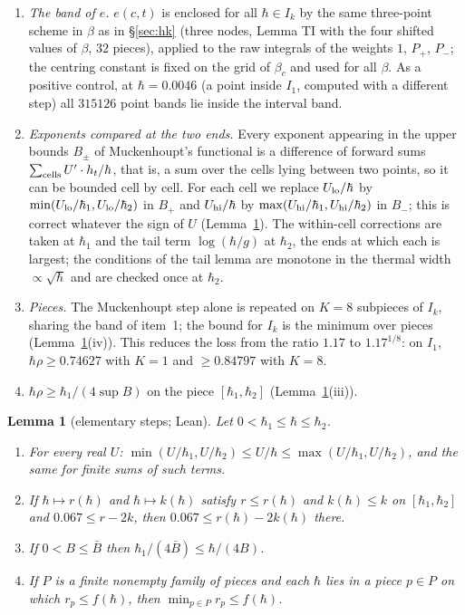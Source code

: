 \documentclass[11pt,a4paper]{article}
\newtheorem{lemma}[theorem]{Lemma}
\theoremstyle{definition}
\theoremstyle{remark}
\newcommand{\hr}{\hbar\rho}
\begin{document}
\begin{enumerate}[leftmargin=2em]
\item \emph{The band of $e$.} $e(c,t)$ is enclosed for all $\hbar\in I_k$ by the same three-point scheme in $\beta$ as in \S\ref{sec:hk} (three nodes, Lemma TI with the four shifted values of $\beta$, $32$ pieces), applied to the raw integrals of the weights $1$, $P_+$, $P_-$; the centring constant is fixed on the grid of $\beta_c$ and used for all $\beta$. As a positive control, at $\hbar=0.0046$ (a point inside $I_1$, computed with a different step) all $315126$ point bands lie inside the interval band.
\item \emph{Exponents compared at the two ends.} Every exponent appearing in the upper bounds $B_\pm$ of Muckenhoupt's functional is a difference of forward sums $\sum_{\rm cells}U'\cdot h_t/\hbar$, that is, a sum over the cells lying between two points, so it can be bounded cell by cell. For each cell we replace $U_{\rm lo}/\hbar$ by $\min(U_{\rm lo}/\hbar_1,U_{\rm lo}/\hbar_2)$ in $B_+$ and $U_{\rm hi}/\hbar$ by $\max(U_{\rm hi}/\hbar_1,U_{\rm hi}/\hbar_2)$ in $B_-$; this is correct whatever the sign of $U$ (Lemma~\ref{lem:cell}). The within-cell corrections are taken at $\hbar_1$ and the tail term $\log(\hbar/g)$ at $\hbar_2$, the ends at which each is largest; the conditions of the tail lemma are monotone in the thermal width $\propto\sqrt\hbar$ and are checked once at $\hbar_2$.
\item \emph{Pieces.} The Muckenhoupt step alone is repeated on $K=8$ subpieces of $I_k$, sharing the band of item~1; the bound for $I_k$ is the minimum over pieces (Lemma~\ref{lem:cell}(iv)). This reduces the loss from the ratio $1.17$ to $1.17^{1/8}$: on $I_1$, $\hr\ge0.74627$ with $K=1$ and $\ge0.84797$ with $K=8$.
\item $\hr\ge\hbar_1/(4\sup B)$ on the piece $[\hbar_1,\hbar_2]$ (Lemma~\ref{lem:cell}(iii)).
\end{enumerate}

\begin{lemma}[elementary steps; Lean]\label{lem:cell}
Let $0<\hbar_1\le\hbar\le\hbar_2$.
\begin{enumerate}[label=(\roman*),leftmargin=2em]
\item For every real $U$: $\min(U/\hbar_1,U/\hbar_2)\le U/\hbar\le\max(U/\hbar_1,U/\hbar_2)$, and the same for finite sums of such terms.
\item If $\hbar\mapsto r(\hbar)$ and $\hbar\mapsto k(\hbar)$ satisfy $r\le r(\hbar)$ and $k(\hbar)\le k$ on $[\hbar_1,\hbar_2]$ and $0.067\le r-2k$, then $0.067\le r(\hbar)-2k(\hbar)$ there.
\item If $0<B\le\bar B$ then $\hbar_1/(4\bar B)\le\hbar/(4B)$.
\item If $P$ is a finite nonempty family of pieces and each $\hbar$ lies in a piece $p\in P$ on which $r_p\le f(\hbar)$, then $\min_{p\in P}r_p\le f(\hbar)$.
\end{enumerate}
\end{lemma}
\end{document}
